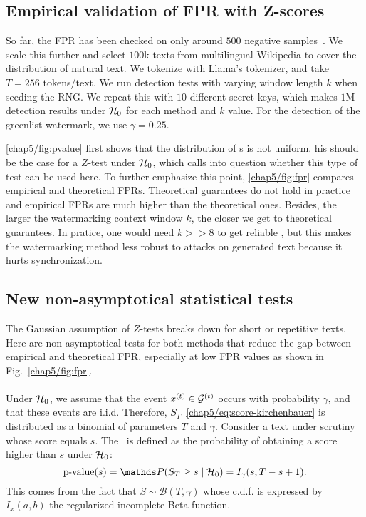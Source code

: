 \subsection{Empirical validation of FPR with Z-scores}\label{chap5/sec:zscore}

So far, the FPR has been checked on only around $500$ negative samples~\citep{kirchenbauer2023watermark,kirchenbauer2023reliability, zhao2023provable}.
We scale this further and select $100$k texts from multilingual Wikipedia to cover the distribution of natural text.
We tokenize with Llama's tokenizer, and take $T=256$ tokens/text.
We run detection tests with varying window length $k$ when seeding the RNG. 
We repeat this with $10$ different secret keys, which makes $1$M detection results under $\mathcal{H}_0$ for each method and $k$ value.
For the detection of the greenlist watermark, we use $\gamma=0.25$.

\autoref{chap5/fig:pvalue} first shows that the distribution of \pval s is not uniform.
his should be the case for a $Z$-test under $\mathcal{H}_0$, which calls into question whether this type of test can be used here.
To further emphasize this point, \autoref{chap5/fig:fpr} compares empirical and theoretical FPRs.
Theoretical guarantees do not hold in practice and empirical FPRs are much higher than the theoretical ones.
Besides, the larger the watermarking context window $k$, the closer we get to theoretical guarantees. 
In pratice, one would need $k>>8$ to get reliable \pval, but this makes the watermarking method less robust to attacks on generated text because it hurts synchronization.


\subsection{New non-asymptotical statistical tests}\label{chap5/sec:new-stats}

The Gaussian assumption of $Z$-tests breaks down for short or repetitive texts.
Here are non-asymptotical tests for both methods that reduce the gap between empirical and theoretical FPR, especially at low FPR values as shown in Fig.~\ref{chap5/fig:fpr}.

\paragraph*{\texorpdfstring{\citep{kirchenbauer2023watermark}}{}} 
Under $\mathcal{H}_0$, we assume that the event $x^{(t)}\in\mathcal{G}^{(t)}$ occurs with probability $\gamma$, and that these events are i.i.d.
Therefore, $S_T$~\eqref{chap5/eq:score-kirchenbauer} is distributed as a binomial of parameters $T$ and $\gamma$. Consider a text under scrutiny whose score equals $s$.
The \pval\ is defined as the probability of obtaining a score higher than $s$ under $\mathcal{H}_0$: %
\begin{equation}
    \text{p-value}(s) = \Prob(S_T \geq s \mid \H_0) = I_{\gamma}(s,T-s+1).
\end{equation}
This comes from the fact that $S\sim\mathcal{B}(T,\gamma)$ whose c.d.f. is expressed by $I_x(a,b)$ the regularized incomplete Beta function.

